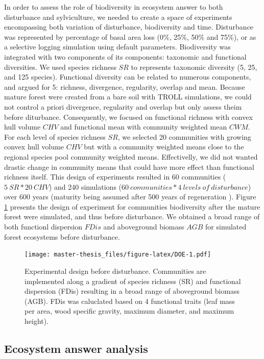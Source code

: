 \documentclass[12pt,]{article}
\theoremstyle{definition}
\theoremstyle{definition}
\theoremstyle{remark}
\begin{document}
In order to assess the role of biodiversity in ecosystem answer to both
disturbance and sylviculture, we needed to create a space of experiments
encompassing both variation of disturbance, biodiversity and time.
Disturbance was represented by percentage of basal area loss (0\%, 25\%,
50\% and 75\%), or as a selective logging simulation using default
parameters. Biodiversity was integrated with two components of its
components: taxonomic and functional diversities. We used species
richness \(SR\) to represents taxonomic diversity (5, 25, and 125
species). Functional diversity can be related to numerous components,
and \citet{Borgy2017} argued for 5: richness, divergence, regularity,
overlap and mean. Because mature forest were created from a bare soil
with TROLL simulations, we could not control a priori divergence,
regularity and overlap but only assess theim before diturbance.
Consequently, we focused on functional richness with convex hull volume
\(CHV\) and functional mean with community weighted mean \(CWM\). For
each level of species richness \(SR\), we selected 20 communities with
growing convex hull volume \(CHV\) but with a community weighted means
close to the regional species pool community weighted means.
Effectivelly, we did not wanted drastic change in community means that
could have more effect than functional richness itself. This design of
experiments resulted in 60 communities (\(5~SR*20~CHV\)) and 240
simulations (\(60 ~communities*4~levels~of~disturbance\)) over 600 years
(maturity being assumed after 500 years of regeneration \citep{Li}).
Figure \ref{fig:DOE} presents the design of experiment for communities
biodiversity after the mature forest were simulated, and thus before
disturbance. We obtained a broad range of both functionl dispersion
\(FDis\) and aboveground biomass \(AGB\) for simulated forest ecosystems
before disturbance.

\begin{figure}[htbp]
\centering
\texttt{[image: master-thesis\_files/figure-latex/DOE-1.pdf]}
\caption{\label{fig:DOE}Experimental design before disturbance. Communities
are implemented along a gradient of species richness (SR) and functional
dispersion (FDis) resulting in a broad range of aboveground biomass
(AGB). FDis was caluclated based on 4 functional traits (leaf mass per
area, wood specific gravity, maximum diameter, and maximum height).}
\end{figure}

\subsection{Ecosystem answer analysis}\label{ecosystem-answer-analysis}
\end{document}
